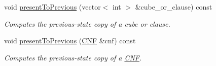 \begin{DoxyCompactItemize}
void \hyperlink{classCounterGenSAT_ae002e52e6b64edabf24158fdb4b736a5}{present\-To\-Previous} (vector$<$ int $>$ \&cube\-\_\-or\-\_\-clause) const 
\begin{DoxyCompactList}\small\item\em Computes the previous-\/state copy of a cube or clause. \end{DoxyCompactList}\item 
void \hyperlink{classCounterGenSAT_aea04c198d4cd8c8b61c92f6ee2d5d2fc}{present\-To\-Previous} (\hyperlink{classCNF}{C\-N\-F} \&cnf) const 
\begin{DoxyCompactList}\small\item\em Computes the previous-\/state copy of a \hyperlink{classCNF}{C\-N\-F}. \end{DoxyCompactList}\end{DoxyCompactItemize}
